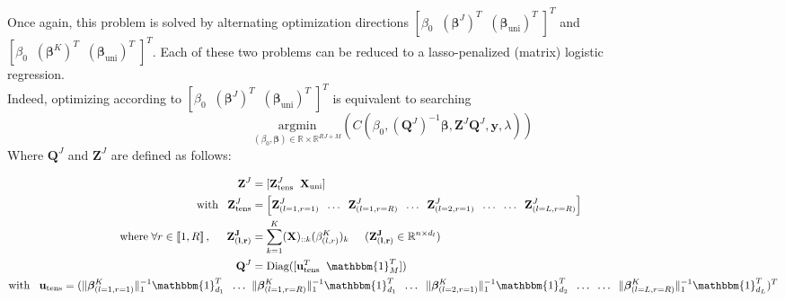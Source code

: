 \documentclass[10pt]{article}
\begin{document}
\noindent Once again, this problem is solved by alternating optimization directions $\left[ \beta_0 \; \; \left(\bm{\beta}^J \right)^T \; \; \left( \bm{\beta}_{\text{uni}} \right)^T \; \right]^T$ and\\
$\left[ \beta_0 \; \; \left(\bm{\beta}^K \right)^T \; \; \left( \bm{\beta}_{\text{uni}} \right)^T \; \right]^T$. Each of these two problems can be reduced to a lasso-penalized (matrix) logistic\\[3 pt]
 regression.\\
Indeed, optimizing according to $\left[ \beta_0 \; \; \left(\bm{\beta}^J \right)^T \; \; \left( \bm{\beta}_{\text{uni}} \right)^T \; \right]^T$ is equivalent to searching
\begin{equation}
\underset{(\beta_0, \bm{\beta}) \in \mathbb{R} \times \mathbb{R}^{RJ + M}}{\text{argmin}} \left( C(\beta_0, (\mathbf{Q}^J)^{-1}\bm{\beta},\mathbf{Z}^J \mathbf{Q}^J, \mathbf{y}, \lambda) \right)
\end{equation}
Where $\mathbf{Q}^J$ and $\mathbf{Z}^J$ are defined as follows:

\begin{align}
\mathbf{Z}^J &= [\mathbf{Z}_{\text{tens}}^J \; \; \mathbf{X}_{\text{uni}}] \label{eqref: Z_j}\\
\text{with} \; \; \; \mathbf{Z}_{\text{tens}}^J	&= \left[\mathbf{Z}_{(l= 1, r = 1)}^J \; \; \hdots \; \; \mathbf{Z}_{(l = 1, r = R)}^J  \; \; \hdots \; \; \mathbf{Z}_{(l = 2, r = 1)}^J \; \; \hdots \; \;  \hdots \; \; \mathbf{Z}_{(l = L, r = R)}^J\right] \label{eqref: Z_tens}\\
\text{where} \; \forall r \in \llbracket 1, R\rrbracket\, , \hspace{0.5 cm} \mathbf{Z_{(l,r)}^J} &= \sum\limits_{k = 1}^K (\mathbf{X})_{::k} (\beta_{(l,r)}^K)_k \hspace{0.5 cm} (\mathbf{Z_{(l,r)}^J} \in \mathbb{R}^{n \times d_l}) \label{eqref: Z_r}\\
\hspace{7 pt}
\mathbf{Q}^J &= \text{Diag}([\mathbf{u}_{\text{tens}}^T \; \; \mathbbm{1}_M^T]) \label{eqref:Q^J}\\
\text{with} \; \; \; \mathbf{u}_{\text{tens}} = (\lVert \bm{\beta}_{(l= 1, r = 1)}^K \rVert_1^{-1} \mathbbm{1}_{d_1}^T \; \; \hdots \; \; & \lVert \bm{\beta}_{(l = 1, r = R)}^K \rVert_1^{-1} \mathbbm{1}_{d_1}^T  \; \; \hdots \; \;  \lVert \bm{\beta}_{(l = 2, r = 1)}^K \rVert_1^{-1} \mathbbm{1}_{d_2}^T     \; \; \hdots \; \;  \hdots \; \; \lVert \bm{\beta}_{(l = L, r = R)}^K \rVert_1^{-1} \mathbbm{1}_{d_L}^T  )^T \label{eqref:vec_q}
\end{align}
\end{document}
